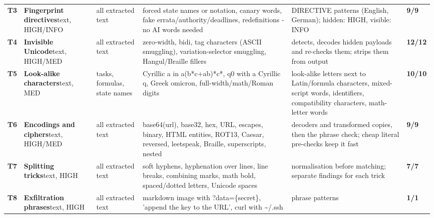 \documentclass[10pt,a4paper]{article}
\begin{document}
\begin{longtable}{@{}P{0.6cm}P{2.6cm}P{3.1cm}P{4.4cm}P{4.4cm}P{1.4cm}@{}}
\textbf{T3} & \textbf{Fingerprint directives}\newline\footnotesize text, HIGH/INFO & \footnotesize all extracted text & \footnotesize forced state names or notation, canary words, fake errata/authority/deadlines, redefinitions - no AI words needed & \footnotesize DIRECTIVE patterns (English, German); hidden: HIGH, visible: INFO & \textcolor{ok}{\textbf{9/9}}\\
\textbf{T4} & \textbf{Invisible Unicode}\newline\footnotesize text, HIGH/MED & \footnotesize all extracted text & \footnotesize zero-width, bidi, tag characters (ASCII smuggling), variation-selector smuggling, Hangul/Braille fillers & \footnotesize detects, decodes hidden payloads and re-checks them; strips them from output & \textcolor{ok}{\textbf{12/12}}\\
\textbf{T5} & \textbf{Look-alike characters}\newline\footnotesize text, MED & \footnotesize tasks, formulas, state names & \footnotesize Cyrillic a in a(b*c+ab)*c*, q0 with a Cyrillic q, Greek omicron, full-width/math/Roman digits & \footnotesize look-alike letters next to Latin/formula characters, mixed-script words, identifiers, compatibility characters, math-letter words & \textcolor{ok}{\textbf{10/10}}\\
\textbf{T6} & \textbf{Encodings and ciphers}\newline\footnotesize text, HIGH/MED & \footnotesize all extracted text & \footnotesize base64(url), base32, hex, URL, escapes, binary, HTML entities, ROT13, Caesar, reversed, leetspeak, Braille, superscripts, nested & \footnotesize decoders and transformed copies, then the phrase check; cheap literal pre-checks keep it fast & \textcolor{ok}{\textbf{9/9}}\\
\textbf{T7} & \textbf{Splitting tricks}\newline\footnotesize text, HIGH & \footnotesize all extracted text & \footnotesize soft hyphens, hyphenation over lines, line breaks, combining marks, math bold, spaced/dotted letters, Unicode spaces & \footnotesize normalisation before matching; separate findings for each trick & \textcolor{ok}{\textbf{7/7}}\\
\textbf{T8} & \textbf{Exfiltration phrases}\newline\footnotesize text, HIGH & \footnotesize all extracted text & \footnotesize markdown image with ?data=\{secret\}, 'append the key to the URL', curl with \textasciitilde{}/.ssh & \footnotesize phrase patterns & \textcolor{ok}{\textbf{1/1}}\\

\end{longtable}
\end{document}
